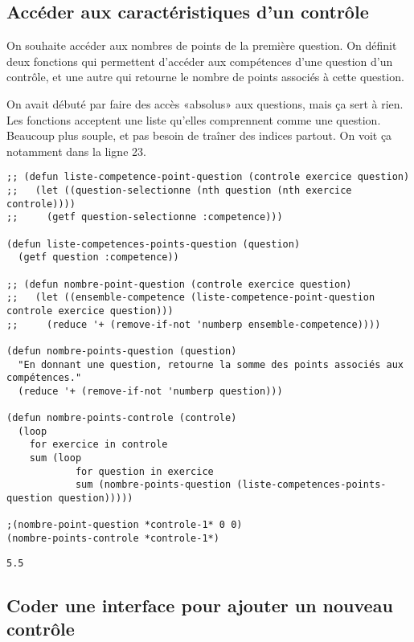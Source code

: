 \documentclass[a4paper, 11pt, DIV=18]{scrartcl}
\begin{document}
\subsection{Accéder aux caractéristiques d'un contrôle}
\label{sec:orge3d1c41}

On souhaite accéder aux nombres de points de la première question. On définit
deux fonctions qui permettent d'accéder aux compétences d'une question d'un
contrôle, et une autre qui retourne le nombre de points associés à cette question.

On avait débuté par faire des accès «absolus» aux questions, mais ça sert à
rien. Les fonctions acceptent une liste qu'elles comprennent comme une question.
Beaucoup plus souple, et pas besoin de traîner des indices partout. On voit ça
notamment dans la ligne 23.

\begin{verbatim}
;; (defun liste-competence-point-question (controle exercice question)
;;   (let ((question-selectionne (nth question (nth exercice controle))))
;;     (getf question-selectionne :competence)))

(defun liste-competences-points-question (question)
  (getf question :competence))

;; (defun nombre-point-question (controle exercice question)
;;   (let ((ensemble-competence (liste-competence-point-question controle exercice question)))
;;     (reduce '+ (remove-if-not 'numberp ensemble-competence))))

(defun nombre-points-question (question)
  "En donnant une question, retourne la somme des points associés aux compétences."
  (reduce '+ (remove-if-not 'numberp question)))

(defun nombre-points-controle (controle)
  (loop
    for exercice in controle
    sum (loop
            for question in exercice
            sum (nombre-points-question (liste-competences-points-question question)))))

;(nombre-point-question *controle-1* 0 0)
(nombre-points-controle *controle-1*)
\end{verbatim}

\begin{verbatim}
5.5
\end{verbatim}

\subsection{Coder une interface pour ajouter un nouveau contrôle}
\label{sec:orgf7d01d7}
\end{document}
